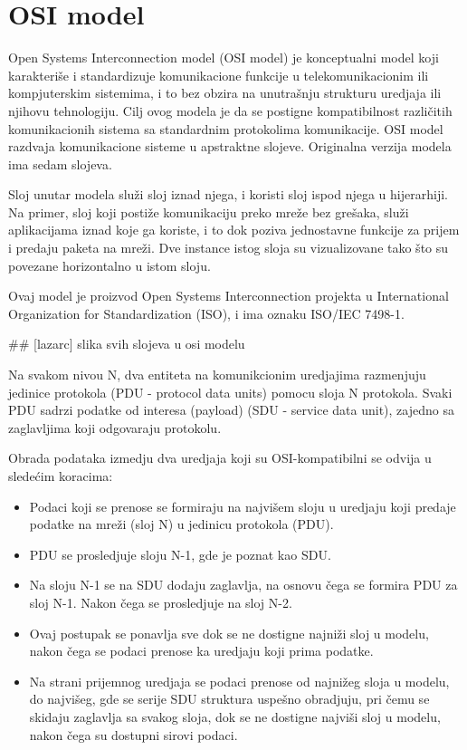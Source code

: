 \documentclass[a4paper,12pt, master]{etf}
\begin{document}
	\section{OSI model}

	Open Systems Interconnection model (OSI model) je konceptualni model koji karakteri\v{s}e i
	standardizuje komunikacione funkcije u telekomunikacionim ili kompjuterskim sistemima, i
	to bez obzira na unutra\v{s}nju strukturu uredjaja ili njihovu tehnologiju. Cilj ovog modela
	je da se postigne kompatibilnost razli\v{c}itih komunikacionih sistema sa standardnim
	protokolima komunikacije. OSI model razdvaja komunikacione sisteme u apstraktne slojeve.
	Originalna verzija modela ima sedam slojeva.

	Sloj unutar modela slu\v{z}i sloj iznad njega, i koristi sloj ispod njega u hijerarhiji. Na
	primer, sloj koji posti\v{z}e komunikaciju preko mre\v{z}e bez gre\v{s}aka, slu\v{z}i aplikacijama iznad
	koje ga koriste, i to dok poziva jednostavne funkcije za prijem i predaju paketa na mre\v{z}i.
	Dve instance istog sloja su vizualizovane tako \v{s}to su povezane horizontalno u istom sloju.

	Ovaj model je proizvod Open Systems Interconnection projekta u International Organization
	for Standardization (ISO), i ima oznaku ISO/IEC 7498-1.

	\#\# [lazarc] slika svih slojeva u osi modelu

	Na svakom nivou N, dva entiteta na komunikcionim uredjajima razmenjuju jedinice protokola
	(PDU - protocol data units) pomocu sloja N protokola. Svaki PDU sadrzi podatke od interesa
	(payload) (SDU - service data unit), zajedno sa zaglavljima koji odgovaraju protokolu.

	Obrada podataka izmedju dva uredjaja koji su OSI-kompatibilni se odvija u slede\'{c}im
	koracima:
	\begin{itemize}
		\item Podaci koji se prenose se formiraju na najvi\v{s}em sloju u uredjaju koji predaje
		podatke na mre\v{z}i (sloj N) u jedinicu protokola (PDU).
		\item PDU se prosledjuje sloju N-1, gde je poznat kao SDU.
		\item Na sloju N-1 se na SDU dodaju zaglavlja, na osnovu \v{c}ega se formira PDU za sloj
		N-1. Nakon \v{c}ega se prosledjuje na sloj N-2.
		\item Ovaj postupak se ponavlja sve dok se ne dostigne najni\v{z}i sloj u modelu, nakon
		\v{c}ega se podaci prenose ka uredjaju koji prima podatke.
		\item Na strani prijemnog uredjaja se podaci prenose od najni\v{z}eg sloja u modelu, do
		najvi\v{s}eg, gde se serije SDU struktura uspe\v{s}no obradjuju, pri \v{c}emu se skidaju zaglavlja
		sa svakog sloja, dok se ne dostigne najvi\v{s}i sloj u modelu, nakon \v{c}ega su dostupni
		sirovi podaci.
	\end{itemize}
\end{document}
